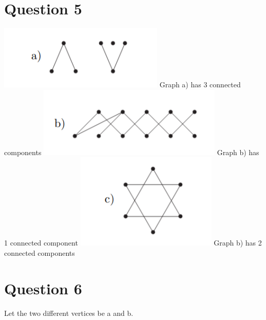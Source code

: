\documentclass{article}
\begin{document}
\section*{Question 5}
\includegraphics[]{Question 4/connectivity_4.a.png}
\newline
Graph a) has 3 connected components
\newline
\includegraphics[]{Question 4/connectivity_4.b.png}
\newline
Graph b) has 1 connected component
\newpage
\includegraphics[]{Question 4/connectivity_4.c.png}
\newline
Graph b) has 2 connected components
\newline

\section*{Question 6}
Let the two different vertices be a and b.
\end{document}
